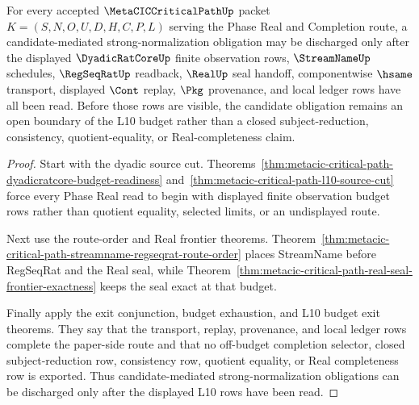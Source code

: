 \begin{theorem}
\label{thm:metacic-critical-path-candidate-sn-obligation-discharge}
For every accepted $\MetaCICCriticalPathUp$ packet $K=(S,N,O,U,D,H,C,P,L)$ serving the Phase Real and Completion route, a candidate-mediated strong-normalization obligation may be discharged only after the displayed $\DyadicRatCoreUp$ finite observation rows, $\StreamNameUp$ schedules, $\RegSeqRatUp$ readback, $\RealUp$ seal handoff, componentwise $\hsame$ transport, displayed $\Cont$ replay, $\Pkg$ provenance, and local ledger rows have all been read. Before those rows are visible, the candidate obligation remains an open boundary of the L10 budget rather than a closed subject-reduction, consistency, quotient-equality, or Real-completeness claim.
\end{theorem}
\begin{proof}
Start with the dyadic source cut. Theorems~\ref{thm:metacic-critical-path-dyadicratcore-budget-readiness} and~\ref{thm:metacic-critical-path-l10-source-cut} force every Phase Real read to begin with displayed finite observation budget rows rather than quotient equality, selected limits, or an undisplayed route.

Next use the route-order and Real frontier theorems. Theorem~\ref{thm:metacic-critical-path-streamname-regseqrat-route-order} places StreamName before RegSeqRat and the Real seal, while Theorem~\ref{thm:metacic-critical-path-real-seal-frontier-exactness} keeps the seal exact at that budget.

Finally apply the exit conjunction, budget exhaustion, and L10 budget exit theorems. They say that the transport, replay, provenance, and local ledger rows complete the paper-side route and that no off-budget completion selector, closed subject-reduction row, consistency row, quotient equality, or Real completeness row is exported. Thus candidate-mediated strong-normalization obligations can be discharged only after the displayed L10 rows have been read.
\end{proof}

